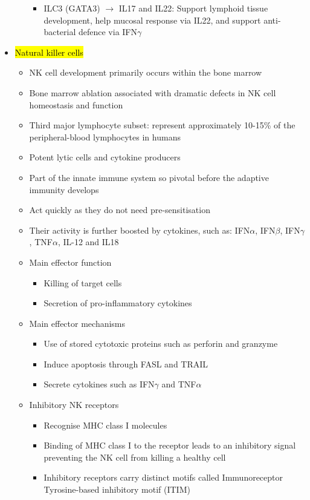 \documentclass[a4paper, 12pt]{article}
\begin{document}
\begin{itemize}
\begin{itemize}
\begin{itemize}
\item{ILC3 (GATA3) $\rightarrow$ IL17 and IL22: Support lymphoid tissue development, help mucosal response via IL22, and support anti-bacterial defence via IFN$\gamma$}
\end{itemize}
\end{itemize}
\item{\hl{Natural killer cells}}
\begin{itemize}
\item{NK cell development primarily occurs within the bone marrow}
\item{Bone marrow ablation associated with dramatic defects in NK cell homeostasis and function}
\item{Third major lymphocyte subset: represent approximately 10-15\% of the peripheral-blood lymphocytes in humans}
\item{Potent lytic cells and cytokine producers}
\item{Part of the innate immune system so pivotal before the adaptive immunity develops}
\item{Act quickly as they do not need pre-sensitisation}
\item{Their activity is further boosted by cytokines, such as: IFN$\alpha$, IFN$\beta$, IFN$\gamma$, TNF$\alpha$, IL-12 and IL18}
\item{Main effector function}
\begin{itemize}
\item{Killing of target cells}
\item{Secretion of pro-inflammatory cytokines}
\end{itemize}
\item{Main effector mechanisms}
\begin{itemize}
\item{Use of stored cytotoxic proteins such as perforin and granzyme}
\item{Induce apoptosis through FASL and TRAIL}
\item{Secrete cytokines such as IFN$\gamma$ and TNF$\alpha$}
\end{itemize}
\item{Inhibitory NK receptors}
\begin{itemize}
\item{Recognise MHC class I molecules}
\item{Binding of MHC class I to the receptor leads to an inhibitory signal preventing the NK cell from killing a healthy cell}
\item{Inhibitory receptors carry distinct motifs called Immunoreceptor Tyrosine-based inhibitory motif (ITIM)}

\end{itemize}
\end{itemize}
\end{itemize}
\end{document}
